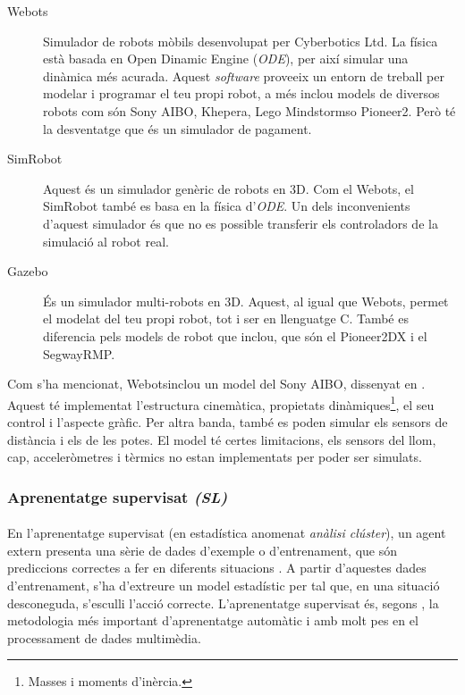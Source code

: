 \documentclass[12pt,a4paper,final,twoside]{article}
\begin{document}
\begin{description}
\item[Webots\texttrademark] \cite{Michel2004} Simulador de robots mòbils desenvolupat per Cyberbotics Ltd. La física està basada en Open Dinamic Engine (\textit{ODE}), per així simular una dinàmica més acurada. Aquest \textit{software} proveeix un entorn de treball per modelar i programar el teu propi robot, a més inclou models de diversos robots com són Sony AIBO, Khepera, Lego Mindstorms\texttrademark o Pioneer2. Però té la desventatge que és un simulador de pagament.

\item[SimRobot] \cite{Laue2006a} Aquest és un simulador genèric de robots en 3D. Com el Webots\texttrademark , el SimRobot també es basa en la física d'\textit{ODE}. Un dels inconvenients d'aquest simulador és que no es possible transferir els controladors de la simulació al robot real.

\item[Gazebo] \cite{Khatib2002} És un simulador multi-robots en 3D. Aquest, al igual que Webots\texttrademark , permet el modelat del teu propi robot, tot i ser en llenguatge C. També es diferencia pels models de robot que inclou, que són el Pioneer2DX i el SegwayRMP.
\end{description}

Com s'ha mencionat, Webots\texttrademark inclou un model del Sony AIBO, dissenyat en \cite{Hohl2006}. Aquest té implementat l'estructura cinemàtica, propietats dinàmiques\footnote{Masses i moments d'inèrcia.}, el seu control i l'aspecte gràfic. Per altra banda, també es poden simular els sensors de distància i els de les potes. El model té certes limitacions, els sensors del llom, cap, acceleròmetres i tèrmics no estan implementats per poder ser simulats. 


\subsubsection{Aprenentatge supervisat \textit{(SL)}}

\paragraph{}En l'aprenentatge supervisat (en estadística anomenat \textit{anàlisi clúster}), un agent extern presenta una sèrie de dades d'exemple o d'entrenament, que són prediccions correctes a fer en diferents situacions \cite{Kober2009}. A partir d'aquestes dades d'entrenament, s'ha d'extreure un model estadístic per tal que, en una situació desconeguda, s'esculli l'acció correcte. L'aprenentatge supervisat és, segons \cite{Cord2008}, la metodologia més important d'aprenentatge automàtic i amb molt pes en el processament de dades multimèdia.
\end{document}

